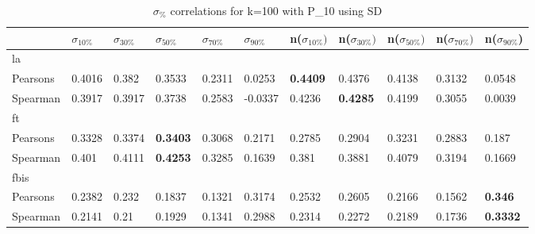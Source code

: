 \documentclass{sig-alternate}
\begin{document}
\begin{table}[h!]
\centering
\begin{tabular}{|l||l|l|l|l|l||l|l|l|l|l|}
\hline
& $\sigma_{10\%}$ & $\sigma_{30\%}$ & $\sigma_{50\%}$ & $\sigma_{70\%}$ & $\sigma_{90\%}$ & n($\sigma_{10\%})$ & n($\sigma_{30\%})$ & n($\sigma_{50\%})$ & n($\sigma_{70\%})$ & n($\sigma_{90\%}$) \\ \hline
\hline la &  &  &  &  &  &  &  &  &  &  \\ \hline
Pearsons & 0.4016 & 0.382 & 0.3533 & 0.2311 & 0.0253 & \textbf{0.4409} & 0.4376 & 0.4138 & 0.3132 & 0.0548 \\ \hline
Spearman & 0.3917 & 0.3917 & 0.3738 & 0.2583 & -0.0337 & 0.4236 & \textbf{0.4285} & 0.4199 & 0.3055 & 0.0039 \\ \hline
\hline ft &  &  &  &  &  &  &  &  &  &  \\ \hline
Pearsons & 0.3328 & 0.3374 & \textbf{0.3403} & 0.3068 & 0.2171 & 0.2785 & 0.2904 & 0.3231 & 0.2883 & 0.187 \\ \hline
Spearman & 0.401 & 0.4111 & \textbf{0.4253} & 0.3285 & 0.1639 & 0.381 & 0.3881 & 0.4079 & 0.3194 & 0.1669 \\ \hline
\hline fbis &  &  &  &  &  &  &  &  &  &  \\ \hline
Pearsons & 0.2382 & 0.232 & 0.1837 & 0.1321 & 0.3174 & 0.2532 & 0.2605 & 0.2166 & 0.1562 & \textbf{0.346} \\ \hline
Spearman & 0.2141 & 0.21 & 0.1929 & 0.1341 & 0.2988 & 0.2314 & 0.2272 & 0.2189 & 0.1736 & \textbf{0.3332} \\ \hline
\end{tabular}
\caption{$\sigma_{\%}$ correlations for k=100 with P\_10 using SD}
\end{table}
\end{document}
